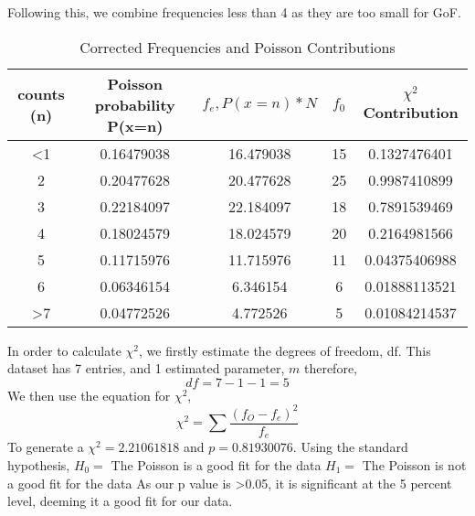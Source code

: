 \documentclass[11pt]{article}
\begin{document}
    Following this, we combine frequencies less than 4 as they are too small for GoF. 
    \begin{table}[]
        \centering
        \begin{tabular}{|c|c|c|c|c|}
         \hline
           counts (n)  & Poisson probability P(x=n) & $ f_{e}, P(x=n) * N$ & $f_{0}$ & $\chi^{2}$ Contribution\\
 \hline
            <1 & 0.16479038 & 16.479038 & 15 &0.1327476401\\
            2 & 0.20477628 & 20.477628 & 25&0.9987410899\\
            3 & 0.22184097 & 22.184097 & 18&0.7891539469\\
            4 & 0.18024579 & 18.024579 & 20&0.2164981566\\
            5 & 0.11715976 & 11.715976 & 11&0.04375406988\\
            6 & 0.06346154 & 6.346154 & 6 &0.01888113521\\
            >7 & 0.04772526 & 4.772526 & 5 &0.01084214537\\      
 \hline
        \end{tabular}
        \caption{Corrected Frequencies and Poisson Contributions}
        \label{tab:my_label}
    \end{table}
    In order to calculate $\chi^{2}$, we firstly estimate the degrees of freedom, df. This dataset has 7 entries, and 1 estimated parameter, $m$ therefore, 
    $$df = 7 - 1 - 1 = 5$$
    We then use the equation for $\chi^{2}$, 
    $$\chi^{2} = \sum{\frac{(f_{O}-f_{e})^{2}}{f_{e}}}$$
    To generate a $\chi^{2} = 2.21061818$ and $p = 0.81930076$. Using the standard hypothesis,
    \newline
    $H_{0} =$ The Poisson is a good fit for the data
    \newline
    $H_{1} =$ The Poisson is not a good fit for the data
    \newline
    As our p value is >0.05, it is significant at the 
    5 percent level, deeming it a good fit for our data. 
     
\end{document}
